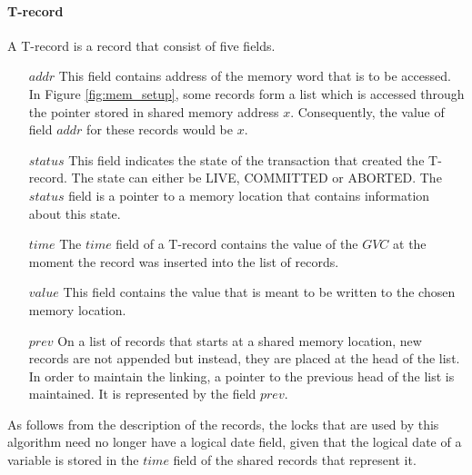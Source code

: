 \documentclass[11pt,letterpaper]{article}
\begin{document}
\paragraph{T-record}
A T-record is a record that consist of five fields.
\begin{itemize}
\vspace{-0.1cm}
\item[$\mathit{addr}$]
This field contains address of the memory word that is to be accessed. 
In Figure \ref{fig:mem_setup}, some records form a list which is accessed 
through the pointer stored in shared memory address $\mathit{x}$. 
Consequently, the 
value of field $\mathit{addr}$ for these records would be $\mathit{x}$.
\vspace{-0.2cm}
\item[$\mathit{status}$]
This  field  indicates  the  state  of the  transaction  that  created  the
T-record. The  
state can either be LIVE, COMMITTED or ABORTED. 
The $\mathit{status}$ field is a 
pointer to a memory location that contains information about this state.
\vspace{-0.2cm}
\item[$\mathit{time}$]
The  $\mathit{time}$  field of  a T-record  contains the  
value of  the $\mathit{GVC}$  at  the  moment the  record  was 
inserted  into the  list of   records. 
\vspace{-0.2cm}
\item[$\mathit{value}$]
This field contains the value that is meant to be written to the chosen 
memory location.
\vspace{-0.2cm}
\item[$\mathit{prev}$]
On a list of records that starts at a shared memory location, new records 
are not appended but  instead, they are placed at the head  of the list. In
order to  maintain the linking, a  pointer to the previous head of the list
is maintained. It is  represented by the field $\mathit{prev}$.
\end{itemize}

As follows from the description of  the records, the locks that are used by
this  algorithm need no longer have a logical date  field,
 given that the logical date  of a variable is stored in the $\mathit{time}$ 
field of the shared records that represent it.
\end{document}
